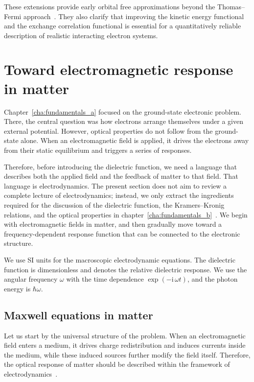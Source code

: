 These extensions provide early orbital free approximations beyond the Thomas--Fermi approach~\cite{lieb1981thomas}.
They also clarify that improving the kinetic energy functional and the exchange correlation functional is essential for a quantitatively reliable description of realistic interacting electron systems.

\newpage
\section{Toward electromagnetic response in matter}
\label{sec:toward_electromagnetic_response_in_matter}

Chapter~\ref{cha:fundamentals_a} focused on the ground-state electronic problem.
There, the central question was how electrons arrange themselves under a given external potential.
However, optical properties do not follow from the ground-state alone.
When an electromagnetic field is applied,
it drives the electrons away from their static equilibrium and triggers a series of responses.

Therefore, before introducing the dielectric function, we need a language that describes both the applied field and the feedback of matter to that field.
That language is electrodynamics.
The present section does not aim to review a complete lecture of electrodynamics;
instead, we only extract the ingredients required for the discussion of the dielectric function, the Kramers--Kronig relations, and the optical properties in chapter~\ref{cha:fundamentals_b}~\cite{landau2013electrodynamics,griffiths2023introduction}.
We begin with electromagnetic fields in matter, and then gradually move toward a frequency-dependent response function that can be connected to the electronic structure.

We use SI units for the macroscopic electrodynamic equations.
The dielectric function is dimensionless and denotes the relative dielectric response.
We use the angular frequency $\omega$ with the time dependence $\exp(-\mathrm{i}\,\omega t)$,
and the photon energy is $\hbar\omega$.

\subsection{Maxwell equations in matter}

Let us start by the universal structure of the problem.
When an electromagnetic field enters a medium, it drives charge redistribution and induces currents inside the medium, while these induced sources further modify the field itself.
Therefore, the optical response of matter should be described within the framework of electrodynamics~\cite{landau2013electrodynamics,griffiths2023introduction}.

